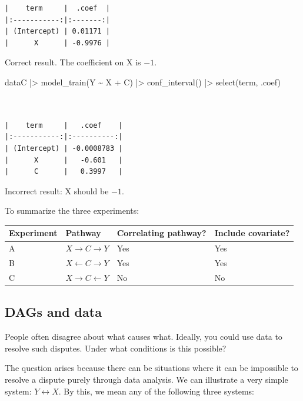 \documentclass[
  letterpaper,
  DIV=11,
  numbers=noendperiod,
  oneside]{scrartcl}
\newenvironment{Shaded}{\begin{snugshade}}{\end{snugshade}}
\newcommand{\FunctionTok}[1]{\textcolor[rgb]{0.28,0.35,0.67}{#1}}
\newcommand{\NormalTok}[1]{\textcolor[rgb]{0.00,0.23,0.31}{#1}}
\newcommand{\SpecialCharTok}[1]{\textcolor[rgb]{0.37,0.37,0.37}{#1}}
\begin{document}
\begin{tcolorbox}
\begin{verbatim}
|    term     |  .coef  |
|:-----------:|:-------:|
| (Intercept) | 0.01171 |
|      X      | -0.9976 |
\end{verbatim}

Correct result. The coefficient on X is \(-1\).

\begin{Shaded}
\begin{Highlighting}[]
\NormalTok{dataC }\SpecialCharTok{|\textgreater{}} \FunctionTok{model\_train}\NormalTok{(Y }\SpecialCharTok{\textasciitilde{}}\NormalTok{ X }\SpecialCharTok{+}\NormalTok{ C) }\SpecialCharTok{|\textgreater{}} 
  \FunctionTok{conf\_interval}\NormalTok{() }\SpecialCharTok{|\textgreater{}}
  \FunctionTok{select}\NormalTok{(term, .coef)}
\end{Highlighting}
\end{Shaded}

\begin{verbatim}


|    term     |   .coef    |
|:-----------:|:----------:|
| (Intercept) | -0.0008783 |
|      X      |   -0.601   |
|      C      |   0.3997   |
\end{verbatim}

Incorrect result: X should be \(-1\).

\end{tcolorbox}

To summarize the three experiments:

\begin{longtable}[]{@{}llll@{}}
\toprule\noalign{}
Experiment & Pathway & Correlating pathway? & Include covariate? \\
\midrule\noalign{}
\endhead
\bottomrule\noalign{}
\endlastfoot
A & \(X \rightarrow C \rightarrow Y\) & Yes & Yes \\
B & \(X \leftarrow C \rightarrow Y\) & Yes & Yes \\
C & \(X \rightarrow C \leftarrow Y\) & No & No \\
\end{longtable}

\subsection{DAGs and data}\label{sec-dags-and-data}

People often disagree about what causes what. Ideally, you could use
data to resolve such disputes. Under what conditions is this possible?

The question arises because there can be situations where it can be
impossible to resolve a dispute purely through data analysis. We can
illustrate a very simple system: \(Y \leftrightarrow X\). By this, we
mean any of the following three systems:
\end{document}
